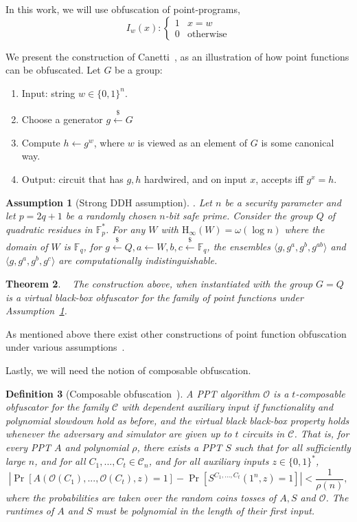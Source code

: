 \documentclass[11pt]{article}
\newcommand{\assref}[1]{\mbox{Assumption~\ref{#1}}}
\newcommand{\zo}{\ensuremath{\{0, 1\}}}
\newcommand{\Hoo}{\mathrm{H}_\infty}
\newtheorem{theorem}{Theorem}[section]
\newtheorem{definition}[theorem]{Definition}
\newtheorem{assumption}[theorem]{Assumption}
\begin{document}
In this work, we will use obfuscation of point-programs,
\[
I_w(x):\begin{cases} 1 & x=w\\0 & \text{otherwise}\end{cases}
\]

We present the construction of Canetti~\cite{canetti1997towards}, as an illustration of how point functions can be obfuscated.  Let $G$ be a group:
\begin{enumerate}
\item Input: string $w\in \zo^n$.
\item Choose a generator $g\overset{\$}\leftarrow G$
\item Compute $h\leftarrow g^w$, where $w$ is viewed as an element of $G$ is some canonical way.
\item Output: circuit that has $g, h$ hardwired, and on input $x$, accepts iff $g^x=h$.
\end{enumerate}
\begin{assumption}[Strong DDH assumption]\label{ass:strong ddh}.  Let $n$ be a security parameter and let $p = 2q+1$ be a randomly chosen $n$-bit safe prime.  Consider the group $Q$ of quadratic residues in $\mathbb{F}_p^*$.  For any $W$ with $\Hoo(W)= \omega(\log n)$ where the domain of $W$ is $\mathbb{F}_q$, for $g\overset{\$}\leftarrow Q, a\leftarrow W, b,c \overset{\$}\leftarrow \mathbb{F}_q$, the ensembles $\langle g, g^a, g^b, g^{ab}\rangle$ and $\langle g, g^a, g^b, g^c\rangle$ are computationally indistinguishable.
\end{assumption}
\begin{theorem}~\cite{canetti1997towards}
The construction above, when instantiated with the group $G = Q$ is a virtual black-box obfuscator for the family of point functions under \assref{ass:strong ddh}.
\end{theorem}

As mentioned above there exist other constructions of point function obfuscation under various assumptions~\cite{lynn2004positive, wee2005obfuscating}.

Lastly, we will need the notion of composable obfuscation.

\begin{definition}[Composable obfuscation~\cite{bitansky2010strong, canetti2008obfuscating,lynn2004positive}]
\label{def:obf comp}
A PPT algorithm $\mathcal{O}$ is a $t$-\emph{composable obfuscator} for the family $\mathcal{C}$ with dependent auxiliary input if functionality and polynomial slowdown hold as before, and the virtual black black-box property holds whenever the adversary and simulator are given up to $t$ circuits in $\mathcal{C}$.  That is, for every PPT $A$ and polynomial $\rho$, there exists a PPT $S$ such that for all sufficiently large $n$, and for all $C_1,..., C_t\in \mathcal{C}_n$, and for all auxiliary inputs $z\in \zo^*$,
\[
|\Pr[A(\mathcal{O}(C_1), ..., \mathcal{O}(C_t), z) = 1] - \Pr[S^{C_1,..., C_t}(1^n, z) = 1]| < \frac{1}{\rho(n)},
\]
where the probabilities are taken over the random coins tosses of $A, S$ and $\mathcal{O}$.  The runtimes of $A$ and $S$ must be polynomial in the length of their first input.
\end{definition}
\end{document}
